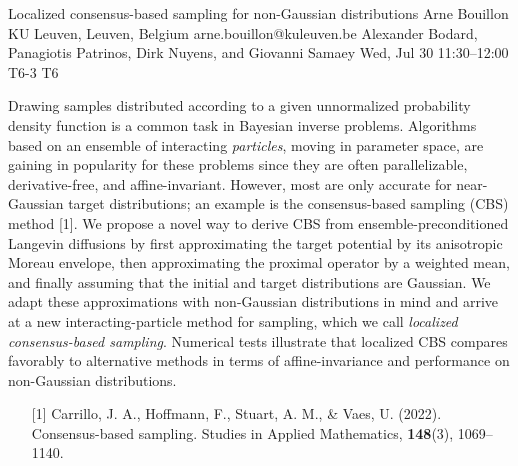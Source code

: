 \begin{talk}
  {Localized consensus-based sampling for non-Gaussian distributions}%
  {Arne Bouillon}%
  {KU Leuven, Leuven, Belgium}%
  {arne.bouillon@kuleuven.be}%
  {Alexander Bodard, Panagiotis Patrinos, Dirk Nuyens, and Giovanni Samaey}%
  {}%
  {Wed, Jul 30 11:30–12:00}%
  {T6-3}%
  {T6}%
  
				

  Drawing samples distributed according to a given unnormalized probability density function is a common task in Bayesian inverse problems. Algorithms based on an ensemble of interacting \emph{particles}, moving in parameter space, are gaining in popularity for these problems since they are often parallelizable, derivative-free, and affine-invariant. However, most are only accurate for near-Gaussian target distributions; an example is the consensus-based sampling (CBS) method [1]. We propose a novel way to derive CBS from ensemble-preconditioned Langevin diffusions by first approximating the target potential by its anisotropic Moreau envelope, then approximating the proximal operator by a weighted mean, and finally assuming that the initial and target distributions are Gaussian. We adapt these approximations with non-Gaussian distributions in mind and arrive at a new interacting-particle method for sampling, which we call \emph{localized consensus-based sampling}. Numerical tests illustrate that localized CBS compares favorably to alternative methods in terms of affine-invariance and performance on non-Gaussian distributions.
\medskip

\begin{enumerate}
  \item[{[1]}] Carrillo, J. A., Hoffmann, F., Stuart, A. M., \& Vaes, U. (2022). Consensus-based sampling. Studies in Applied Mathematics, \textbf{148}(3), 1069--1140.
\end{enumerate}
\end{talk}

